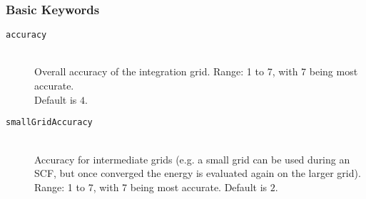 \subsubsection{Basic Keywords}
\begin{description}
  \item [\texttt{accuracy}]\hfill \\
  Overall accuracy of the integration grid. Range: 1 to 7, with 7 being most accurate.\\ Default is $4$.
 \item [\texttt{smallGridAccuracy}]\hfill \\
 Accuracy for intermediate grids (e.g. a small grid can be used during an SCF, but once converged the energy is evaluated again on the larger grid). Range: 1 to 7, with 7 being most accurate. Default is $2$.
\end{description}

